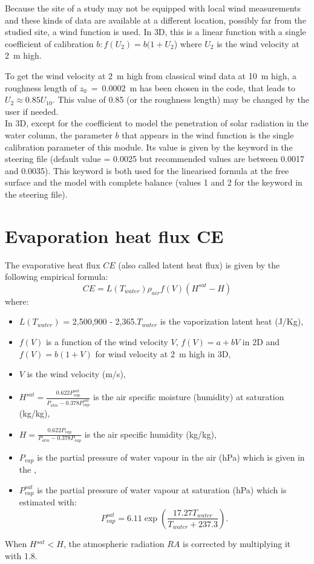 Because the site of a study may not be equipped with local wind measurements
and these kinds of data are available at a different location, possibly far
from the studied site, a wind function is used. In 3D, this is a linear function with
a single coefficient of calibration $b:f(U_{2}) = b(1+U_{2}$) where $U_{2}$ is
the wind velocity at 2~m high.

To get the wind velocity at 2~m high from classical wind data at 10~m high, a
roughness length of ${z}_{0}~=~0.0002$~m has been chosen in the code,
that leads to $U_{2} \approx 0.85 U_{10}$. This value
of 0.85 (or the roughness length) may be changed by the user if needed.\\

In 3D, except for the coefficient to model the penetration of solar radiation in the
water column, the parameter $b$ that appears in the wind function is the
single calibration parameter of this module. Its value is given by the keyword
in the \waqtel steering file (default
value = 0.0025 but recommended values are between 0.0017 and 0.0035). This
keyword is both used for the linearised formula at the free surface and the
model with complete balance (values 1 and 2 for the keyword
 in the \waqtel steering file).


\section{Evaporation heat flux CE}

The evaporative heat flux $CE$ (also called latent heat flux)
is given by the following empirical formula:
\begin{equation*}
CE = L(T_{water})\rho_{air}f(V) \left(H^{sat}-H \right)
\end{equation*}
where:
\begin{itemize}
\item $L(T_{water})$ = 2,500,900 - 2,365.$T_{water}$ is the vaporization latent heat (J/Kg),
\item $f(V)$ is a function of the wind velocity $V$,
  $f(V) = a+bV$ in 2D and
  $f(V) = b(1+V)$ for wind velocity at 2~m high in 3D,
\item $V$ is the wind velocity (m/s),
\item $H^{sat}=\frac{0.622P^{sat}_{vap}}{P_{atm}-0.378P^{sat}_{vap}}$
is the air specific moisture (humidity) at saturation (kg/kg),
\item $H = \frac{0.622P_{vap}}{P_{atm}-0.378P_{vap}}$ is the air specific humidity (kg/kg),
\item $P_{vap}$ is the partial pressure of water vapour in the air (hPa)
which is given in the ,
\item $P^{sat}_{vap}$ is the partial pressure of water vapour at saturation (hPa) which is estimated with:
\begin{equation*}
P^{sat}_{vap} = 6.11 \exp \left(\frac{17.27T_{water}}{T_{water}+237.3} \right).
\end{equation*}
\end{itemize}

When $H{}^{sat} < H$, the atmospheric radiation $RA$ is corrected by multiplying it with 1.8.
